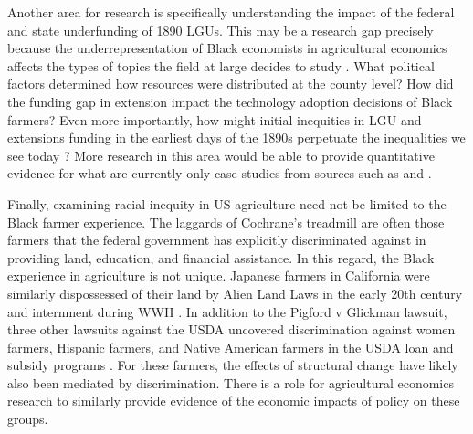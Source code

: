 \documentclass[12pt]{article}
\begin{document}
Another area for research is specifically understanding the impact of the federal and state underfunding of 1890 LGUs. 
This may be a research gap precisely because the underrepresentation of Black economists in agricultural economics affects the types of topics the field at large decides to study \citep{wilson_call_2023}. 
What political factors determined how resources were distributed at the county level? 
How did the funding gap in extension impact the technology adoption decisions of Black farmers?
Even more importantly, how might initial inequities in LGU and extensions funding in the earliest days of the 1890s perpetuate the inequalities we see today \citep{grant_overview_2024,wilson_distribution_2024}?
More research in this area would be able to provide quantitative evidence for what are currently only case studies from sources such as \citet{us_commission_on_civil_rights_equal_1965} and \citet{black_economic_research_center_center_only_1973}.

Finally, examining racial inequity in US agriculture need not be limited to the Black farmer experience. 
The laggards of Cochrane's treadmill are often those farmers that the federal government has explicitly discriminated against in providing land, education, and financial assistance. 
In this regard, the Black experience in agriculture is not unique. 
Japanese farmers in California were similarly dispossessed of their land by Alien Land Laws in the early 20th century and internment during WWII \citep{arellano-bover_displacement_2022,aoki_no_1998}. 
In addition to the Pigford v Glickman lawsuit, three other lawsuits against the USDA uncovered discrimination against women farmers, Hispanic farmers, and Native American farmers in the USDA loan and subsidy programs \citep{casey_racial_2021}. 
For these farmers, the effects of structural change have likely also been mediated by discrimination.
There is a role for agricultural economics research to similarly provide evidence of the economic impacts of policy on these groups. 



\begin{spacing}{1}


\end{spacing}
\end{document}

